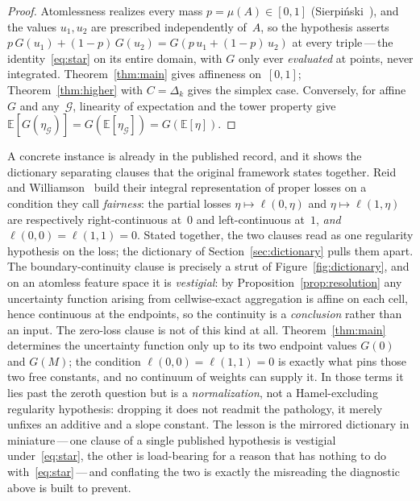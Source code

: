 \documentclass{article}
\theoremstyle{plain}
\theoremstyle{definition}
\newcommand{\E}{\mathbb{E}}
\begin{document}
\begin{proof}
Atomlessness realizes every mass $p=\mu(A)\in[0,1]$
(Sierpi\'nski~\cite{Sierpinski1922}), and the values $u_1,u_2$ are
prescribed independently of~$A$, so the hypothesis asserts
$p\,G(u_1)+(1-p)\,G(u_2)=G(p\,u_1+(1-p)\,u_2)$ at every
triple\,---\,the identity~\eqref{eq:star} on its entire domain, with
$G$ only ever \emph{evaluated} at points, never integrated.
Theorem~\ref{thm:main} gives affineness on~$[0,1]$;
Theorem~\ref{thm:higher} with $C=\Delta_k$ gives the simplex case.
Conversely, for affine~$G$ and any~$\mathcal{G}$, linearity of
expectation and the tower property give
$\E[G(\eta_{\mathcal{G}})]=G(\E[\eta_{\mathcal{G}}])=G(\E[\eta])$.
\end{proof}

A concrete instance is already in the published record, and it shows the
dictionary separating clauses that the original framework states together. Reid and
Williamson~\cite{ReidWilliamson2011} build their integral representation of
proper losses on a condition they call \emph{fairness}: the partial losses
$\eta\mapsto\ell(0,\eta)$ and $\eta\mapsto\ell(1,\eta)$ are respectively
right-continuous at~$0$ and left-continuous at~$1$, \emph{and}
$\ell(0,0)=\ell(1,1)=0$. Stated together, the two clauses read as one
regularity hypothesis on the loss; the dictionary of
Section~\ref{sec:dictionary} pulls them apart. The boundary-continuity clause
is precisely a strut of Figure~\ref{fig:dictionary}, and on an atomless
feature space it is \emph{vestigial}: by Proposition~\ref{prop:resolution}
any uncertainty function arising from cellwise-exact aggregation is affine on
each cell, hence continuous at the endpoints, so the continuity is a
\emph{conclusion} rather than an input. The zero-loss clause is not of this
kind at all. Theorem~\ref{thm:main} determines the uncertainty function only
up to its two endpoint values $G(0)$ and $G(M)$; the condition
$\ell(0,0)=\ell(1,1)=0$ is exactly what pins those two free constants, and no
continuum of weights can supply it. In those terms it lies past the zeroth question but is a
\emph{normalization}, not a Hamel-excluding regularity hypothesis: dropping it
does not readmit the pathology, it merely unfixes an additive and a slope
constant. The lesson is the mirrored dictionary in miniature\,---\,one
clause of a single published hypothesis is vestigial under~\eqref{eq:star},
the other is load-bearing for a reason that has nothing to do
with~\eqref{eq:star}\,---\,and conflating the two is exactly the misreading the diagnostic above is built to prevent.
\end{document}
